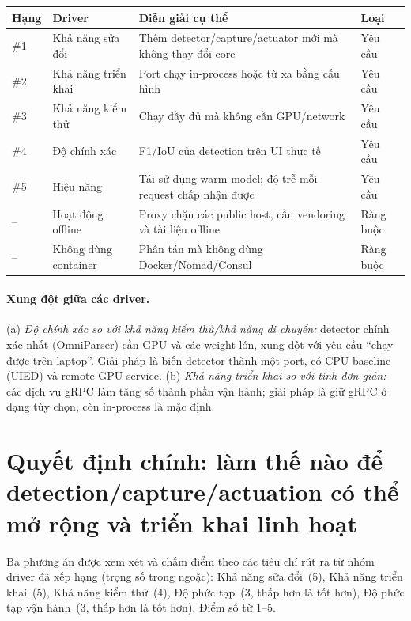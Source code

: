 \documentclass[11pt,a4paper]{report}
\begin{document}
\begin{longtable}{@{}p{0.8cm}p{2.8cm}p{7.4cm}p{2.4cm}@{}}
\toprule
\textbf{Hạng} & \textbf{Driver} & \textbf{Diễn giải cụ thể} & \textbf{Loại} \\
\midrule
\endhead
\#1 & Khả năng sửa đổi & Thêm detector/capture/actuator mới mà không thay đổi core & Yêu cầu \\
\#2 & Khả năng triển khai & Port chạy in-process hoặc từ xa bằng cấu hình & Yêu cầu \\
\#3 & Khả năng kiểm thử & Chạy đầy đủ mà không cần GPU/network & Yêu cầu \\
\#4 & Độ chính xác & F1/IoU của detection trên UI thực tế & Yêu cầu \\
\#5 & Hiệu năng & Tái sử dụng warm model; độ trễ mỗi request chấp nhận được & Yêu cầu \\
-- & Hoạt động offline & Proxy chặn các public host, cần vendoring và tài liệu offline & Ràng buộc \\
-- & Không dùng container & Phân tán mà không dùng Docker/Nomad/Consul & Ràng buộc \\
\bottomrule
\end{longtable}

\paragraph{Xung đột giữa các driver.}
(a) \emph{Độ chính xác so với khả năng kiểm thử/khả năng di chuyển:} detector chính xác
nhất (OmniParser) cần GPU và các weight lớn, xung đột với yêu cầu ``chạy được trên laptop''.
Giải pháp là biến detector thành một port, có CPU baseline (UIED) và remote GPU service.
(b) \emph{Khả năng triển khai so với tính đơn giản:} các dịch vụ gRPC làm tăng số thành
phần vận hành; giải pháp là giữ gRPC ở dạng tùy chọn, còn in-process là mặc định.

\section{Quyết định chính: làm thế nào để detection/capture/actuation có thể mở rộng và triển khai linh hoạt}
Ba phương án được xem xét và chấm điểm theo các tiêu chí rút ra từ nhóm driver đã xếp hạng
(trọng số trong ngoặc): Khả năng sửa đổi~(5), Khả năng triển khai~(5), Khả năng kiểm
thử~(4), Độ phức tạp~(3, thấp hơn là tốt hơn), Độ phức tạp vận hành~(3, thấp hơn là tốt
hơn). Điểm số từ 1--5.
\end{document}
